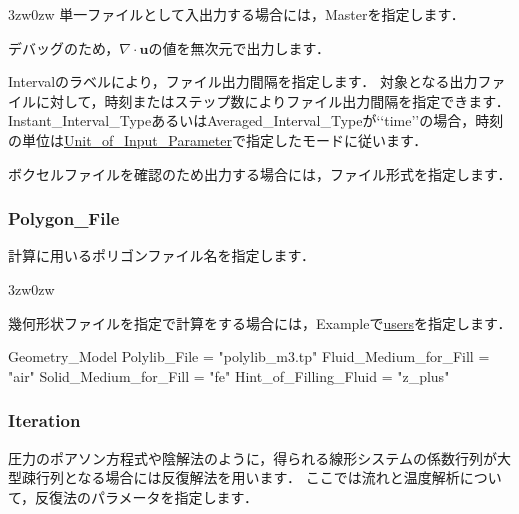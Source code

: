 \begin{indentation}{3zw}{0zw}
単一ファイルとして入出力する場合には，Masterを指定します．

デバッグのため，$\nabla \cdot \bm{u}$の値を無次元で出力します．

Intervalのラベルにより，ファイル出力間隔を指定します．
対象となる出力ファイルに対して，時刻またはステップ数によりファイル出力間隔を指定できます．
Instant\_Interval\_TypeあるいはAveraged\_Interval\_Typeが\lq\lq time\rq\rq の場合，時刻の単位は\hyperlink{tgt:unit}{Unit\_of\_Input\_Parameter}で指定したモードに従います．

ボクセルファイルを確認のため出力する場合には，ファイル形式を指定します．
\end{indentation}



\pagebreak
\subsubsection{Polygon\_File}
計算に用いる\hypertarget{tgt:poly_file_name}{ポリゴンファイル名}を指定します．

\begin{indentation}{3zw}{0zw}

幾何形状ファイルを指定で計算をする場合には，Exampleで\hyperlink{tgt:example}{users}を指定します．

{\small
\begin{program}
  Geometry_Model {
    Polylib_File          = "polylib_m3.tp"
    Fluid_Medium_for_Fill = "air"
    Solid_Medium_for_Fill = "fe"
    Hint_of_Filling_Fluid = "z_plus"
  }
\end{program}
}






\end{indentation}



\pagebreak
\subsubsection{Iteration}

圧力のポアソン方程式や陰解法のように，得られる線形システムの係数行列が大型疎行列となる場合には反復解法を用います．
ここでは流れと温度解析について，\hypertarget{tgt:iteration}{反復法のパラメータを指定}します．


